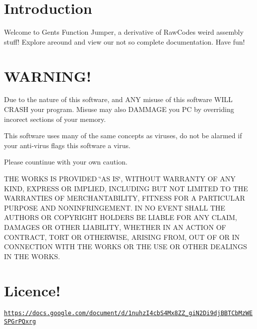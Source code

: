 \hypertarget{index_intro_sec}{}\section{Introduction}\label{index_intro_sec}
Welcome to Gents\textquotesingle{} Function Jumper, a derivative of Raw\+Code\textquotesingle{}s weird assembly stuff! Explore areound and view our not so complete documentation. Have fun!\hypertarget{index_warning_sec}{}\section{W\+A\+R\+N\+I\+N\+G!}\label{index_warning_sec}
Due to the nature of this software, and A\+NY misuse of this software W\+I\+LL C\+R\+A\+SH your program. Misuse may also D\+A\+M\+M\+A\+GE you PC by overriding incorect sections of your memory.

This software uses many of the same concepts as viruses, do not be alarmed if your anti-\/virus flags this software a virus.

Please countinue with your own caution.

T\+HE W\+O\+R\+KS IS P\+R\+O\+V\+I\+D\+ED \char`\"{}\+A\+S I\+S\char`\"{}, W\+I\+T\+H\+O\+UT W\+A\+R\+R\+A\+N\+TY OF A\+NY K\+I\+ND, E\+X\+P\+R\+E\+SS OR I\+M\+P\+L\+I\+ED, I\+N\+C\+L\+U\+D\+I\+NG B\+UT N\+OT L\+I\+M\+I\+T\+ED TO T\+HE W\+A\+R\+R\+A\+N\+T\+I\+ES OF M\+E\+R\+C\+H\+A\+N\+T\+A\+B\+I\+L\+I\+TY, F\+I\+T\+N\+E\+SS F\+OR A P\+A\+R\+T\+I\+C\+U\+L\+AR P\+U\+R\+P\+O\+SE A\+ND N\+O\+N\+I\+N\+F\+R\+I\+N\+G\+E\+M\+E\+NT. IN NO E\+V\+E\+NT S\+H\+A\+LL T\+HE A\+U\+T\+H\+O\+RS OR C\+O\+P\+Y\+R\+I\+G\+HT H\+O\+L\+D\+E\+RS BE L\+I\+A\+B\+LE F\+OR A\+NY C\+L\+A\+IM, D\+A\+M\+A\+G\+ES OR O\+T\+H\+ER L\+I\+A\+B\+I\+L\+I\+TY, W\+H\+E\+T\+H\+ER IN AN A\+C\+T\+I\+ON OF C\+O\+N\+T\+R\+A\+CT, T\+O\+RT OR O\+T\+H\+E\+R\+W\+I\+SE, A\+R\+I\+S\+I\+NG F\+R\+OM, O\+UT OF OR IN C\+O\+N\+N\+E\+C\+T\+I\+ON W\+I\+TH T\+HE W\+O\+R\+KS OR T\+HE U\+SE OR O\+T\+H\+ER D\+E\+A\+L\+I\+N\+GS IN T\+HE W\+O\+R\+KS.\hypertarget{index_licence_sec}{}\section{Licence!}\label{index_licence_sec}
\href{https://docs.google.com/document/d/1nuhzI4cbS4Mx8ZZ_giN2Di9djBBTCbMzWESPGrPQxrg}{\tt https\+://docs.\+google.\+com/document/d/1nuhz\+I4cb\+S4\+Mx8\+Z\+Z\+\_\+gi\+N2\+Di9dj\+B\+B\+T\+Cb\+Mz\+W\+E\+S\+P\+Gr\+P\+Qxrg}



